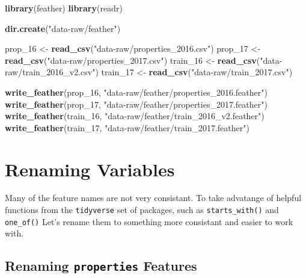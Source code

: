 \documentclass[]{book}
\newenvironment{Shaded}{\begin{snugshade}}{\end{snugshade}}
\newcommand{\KeywordTok}[1]{\textcolor[rgb]{0.13,0.29,0.53}{\textbf{#1}}}
\newcommand{\DecValTok}[1]{\textcolor[rgb]{0.00,0.00,0.81}{#1}}
\newcommand{\StringTok}[1]{\textcolor[rgb]{0.31,0.60,0.02}{#1}}
\newcommand{\NormalTok}[1]{#1}
\theoremstyle{definition}
\theoremstyle{definition}
\theoremstyle{definition}
\theoremstyle{remark}
\begin{document}
\begin{Shaded}
\begin{Highlighting}[]
\KeywordTok{library}\NormalTok{(feather)}
\KeywordTok{library}\NormalTok{(readr)}

\KeywordTok{dir.create}\NormalTok{(}\StringTok{"data-raw/feather"}\NormalTok{)}

\NormalTok{prop_}\DecValTok{16}\NormalTok{ <-}\StringTok{ }\KeywordTok{read_csv}\NormalTok{(}\StringTok{"data-raw/properties_2016.csv"}\NormalTok{)}
\NormalTok{prop_}\DecValTok{17}\NormalTok{ <-}\StringTok{ }\KeywordTok{read_csv}\NormalTok{(}\StringTok{"data-raw/properties_2017.csv"}\NormalTok{)}
\NormalTok{train_}\DecValTok{16}\NormalTok{ <-}\StringTok{ }\KeywordTok{read_csv}\NormalTok{(}\StringTok{"data-raw/train_2016_v2.csv"}\NormalTok{)}
\NormalTok{train_}\DecValTok{17}\NormalTok{ <-}\StringTok{ }\KeywordTok{read_csv}\NormalTok{(}\StringTok{"data-raw/train_2017.csv"}\NormalTok{)}

\KeywordTok{write_feather}\NormalTok{(prop_}\DecValTok{16}\NormalTok{, }\StringTok{"data-raw/feather/properties_2016.feather"}\NormalTok{)}
\KeywordTok{write_feather}\NormalTok{(prop_}\DecValTok{17}\NormalTok{, }\StringTok{"data-raw/feather/properties_2017.feather"}\NormalTok{)}
\KeywordTok{write_feather}\NormalTok{(train_}\DecValTok{16}\NormalTok{, }\StringTok{"data-raw/feather/train_2016_v2.feather"}\NormalTok{)}
\KeywordTok{write_feather}\NormalTok{(train_}\DecValTok{17}\NormalTok{, }\StringTok{"data-raw/feather/train_2017.feather"}\NormalTok{)}
\end{Highlighting}
\end{Shaded}

\section{Renaming Variables}\label{renaming-variables}

Many of the feature names are not very consistant. To take advatange of
helpful functions from the \texttt{tidyverse} set of packages, such as
\texttt{starts\_with()} and \texttt{one\_of()} Let's rename them to
something more consistant and easier to work with.

\subsection{\texorpdfstring{Renaming \texttt{properties}
Features}{Renaming properties Features}}\label{renaming-properties-features}
\end{document}
